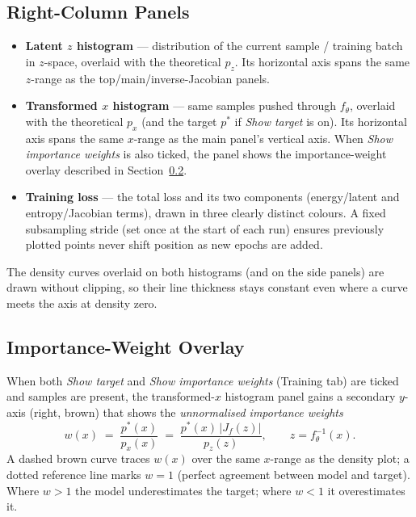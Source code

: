 \documentclass[11pt,a4paper]{article}
\newcommand{\pz}{p_z}
\newcommand{\px}{p_x}
\newcommand{\ft}{f_{\!\theta}}
\newcommand{\Jf}{J_{\!f}}
\begin{document}
\subsection{Right-Column Panels}

\begin{itemize}
  \item \textbf{Latent $z$ histogram} — distribution of the current
        sample / training batch in $z$-space, overlaid with the
        theoretical $\pz$.  Its horizontal axis spans the same $z$-range as
        the top/main/inverse-Jacobian panels.
  \item \textbf{Transformed $x$ histogram} — same samples pushed through
        $\ft$, overlaid with the theoretical $\px$ (and the target $p^*$
        if \emph{Show target} is on).  Its horizontal axis spans the same
        $x$-range as the main panel's vertical axis.  When \emph{Show
        importance weights} is also ticked, the panel shows the
        importance-weight overlay described in Section~\ref{sec:iw}.
  \item \textbf{Training loss} — the total loss and its two components
        (energy/latent and entropy/Jacobian terms), drawn in three clearly
        distinct colours.  A fixed subsampling stride (set once at the start
        of each run) ensures previously plotted points never shift position
        as new epochs are added.
\end{itemize}

The density curves overlaid on both histograms (and on the side panels) are
drawn without clipping, so their line thickness stays constant even where a
curve meets the axis at density zero.

\subsection{Importance-Weight Overlay}
\label{sec:iw}

When both \emph{Show target} and \emph{Show importance weights} (Training
tab) are ticked and samples are present, the transformed-$x$ histogram panel
gains a secondary $y$-axis (right, brown) that shows the
\emph{unnormalised importance weights}
\begin{equation}
  w(x) \;=\; \frac{p^*(x)}{\px(x)}
           \;=\; \frac{p^*(x)\,|\Jf(z)|}{p_z(z)},
  \qquad z = \ft^{-1}(x).
  \label{eq:iw}
\end{equation}
A dashed brown curve traces $w(x)$ over the same $x$-range as the
density plot; a dotted reference line marks $w = 1$ (perfect agreement
between model and target).  Where $w > 1$ the model underestimates the
target; where $w < 1$ it overestimates it.
\end{document}

